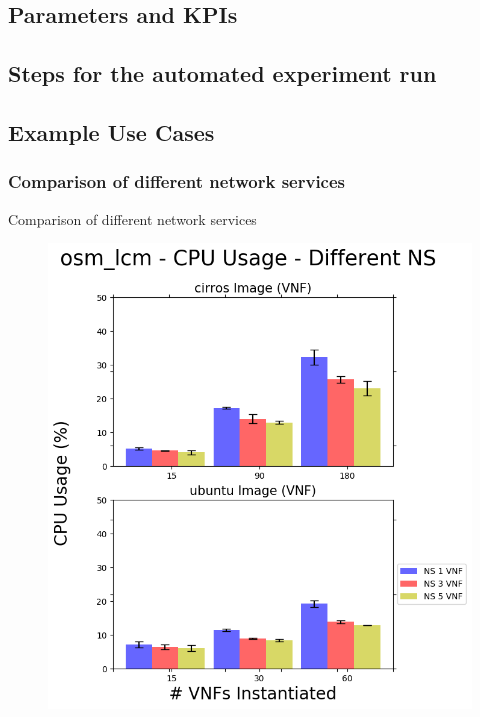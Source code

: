  

\subsection{Parameters and KPIs} 

\subsection{Steps for the automated experiment run} 

\subsection{Example Use Cases}

\subsubsection{Comparison of different network services} 

Comparison of different network services

\begin{figure}[h]
	\centering
	\includegraphics[width=0.7\linewidth]{figures/scalability_graphs/Docker-Grouped-Cases/osm/osm_lcm-Mean-CPU-Cases}
	\caption{}
	\label{fig:osmlcm-mean-cpu-cases}
\end{figure}

